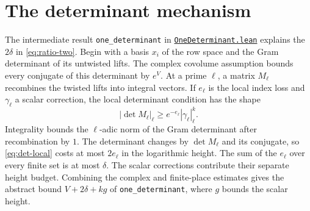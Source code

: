 \documentclass[11pt,oneside,openany]{amsbook}
\theoremstyle{remark}
\numberwithin{equation}{section}
\newcommand{\ghroot}{https://github.com/lsernau/grh-lean/blob/}
\newcommand{\ghrev}{72fead102f663d5c7a407964a13dc0cf9d977207}
\newcommand{\leanfile}[2]{%
  \href{\ghroot\ghrev/grh-compact/src/#1}{\nolinkurl{#2}}}
\begin{document}
\section{The determinant mechanism}
\label{sec:determinant}
The intermediate result \texttt{one\_determinant} in
\leanfile{New/Heights/OneDeterminant.lean}%
{OneDeterminant.lean} explains the $2\delta$ in
\eqref{eq:ratio-two}. Begin with a basis $x_i$ of the row
space and the Gram determinant of its untwisted lifts.
The complex covolume assumption bounds every conjugate of
this determinant by $e^V$. At a prime $\ell$, a matrix
$M_\ell$ recombines the twisted lifts into integral vectors.
If $e_\ell$ is the local index loss and $\gamma_\ell$ a
scalar correction, the local determinant condition has the
shape
\begin{equation}
\label{eq:det-local}
|\det M_\ell|_\ell
 \ge e^{-e_\ell}|\gamma_\ell|_\ell^k.
\end{equation}
Integrality bounds the $\ell$-adic norm of the Gram
determinant after recombination by $1$. The determinant
changes by $\det M_\ell$ and its conjugate, so
\eqref{eq:det-local} costs at most $2e_\ell$ in the
logarithmic height. The sum of the $e_\ell$ over every
finite set is at most $\delta$. The scalar corrections
contribute their separate height budget. Combining the
complex and finite-place estimates gives the abstract
bound $V+2\delta+k g$ of \texttt{one\_determinant},
where $g$ bounds the scalar height.
\end{document}
